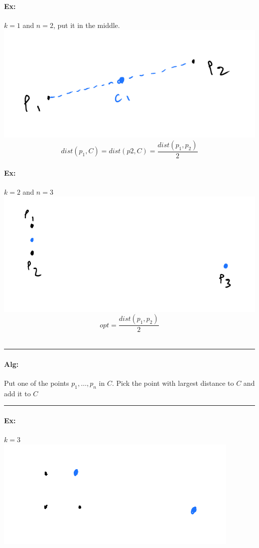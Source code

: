 \documentclass[12 pt]{article}
\begin{document}
          \paragraph{Ex:} $k=1$ and $n=2$, put it in the middle.
          \\ \includegraphics[width=.9\textwidth]{i151.pdf}
          $$dist(p_1,C)=dist(p2,C)=\frac{dist(p_1,p_2)}{2}$$
          \paragraph{Ex:} $k=2$ and $n=3$
          \\ \includegraphics[width=.9\textwidth]{i152.pdf}
          $$opt=\frac{dist(p_1,p_2)}{2}$$
          \\ \noindent \rule{\textwidth}{0.5pt}
          \paragraph{Alg:}
          \begin{algorithmic}
            \State Put one of the points $p_1, \ldots, p_n$ in $C$.
                \State Pick the point with largest distance to $C$ and
                add it to $C$
            \EndFor
          \end{algorithmic}
          \noindent \rule{\textwidth}{0.5pt}
          \paragraph{Ex:} $k=3$
          \\ \includegraphics[width=.9\textwidth]{i153.pdf}
\end{document}
